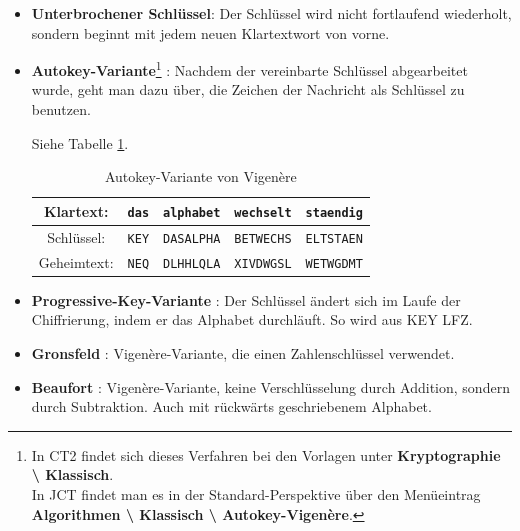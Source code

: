 \begin{refsegment}
\begin{itemize}
\begin{itemize}
   \item \textbf{Unterbrochener Schlüssel}:
     Der Schlüssel wird nicht fortlaufend wiederholt, sondern beginnt mit
     jedem neuen Klartextwort von vorne.



   \item \textbf{Autokey-Variante}\footnote{%
   In CT2 findet sich dieses Verfahren bei den Vorlagen
   unter \textbf{Kryptographie \textbackslash{} Klassisch}.\\
   In JCT findet man es in der Standard-Perspektive
   über den Menüeintrag \textbf{Algorithmen \textbackslash{} Klassisch
   \textbackslash{} Autokey-Vigen\`ere}.
   } \cite{Savard1999}:
      Nachdem der vereinbarte Schlüssel abgearbeitet wurde, geht man dazu
      über, die Zeichen der Nachricht als Schlüssel zu benutzen.

      Siehe Tabelle \ref{Autokey-table-reference}.

   \begin{table}[ht]
   \begin{center}
   \begin{tabular}{|c|c|c|c|c|}
   \hline
   Klartext:   & {\tt das} & {\tt alphabet} & {\tt wechselt} & {\tt staendig}\\
   \hline
   Schlüssel: & {\tt KEY} & {\tt DASALPHA} & {\tt BETWECHS} & {\tt ELTSTAEN}\\
   \hline
   Geheimtext: & {\tt NEQ} & {\tt DLHHLQLA} & {\tt XIVDWGSL} & {\tt WETWGDMT}\\
   \hline
   \end{tabular}
   \caption{Autokey-Variante von Vigen\`ere}
   \label{Autokey-table-reference}	
   \end{center}
   \end{table}  %


   \item \textbf{Progressive-Key-Variante} \cite{Savard1999}:
      Der Schlüssel ändert sich im Laufe der Chiffrierung, indem er das
      Alphabet durchläuft. So wird aus KEY LFZ.

   \item \textbf{Gronsfeld} \cite{Savard1999}:
      Vigen\`ere-Variante, die einen Zahlenschlüssel verwendet.

   \item \textbf{Beaufort} \cite{Savard1999}:
      Vigen\`ere-Variante, keine Verschlüsselung durch Addition, sondern durch
      Subtraktion. Auch mit rückwärts geschriebenem Alphabet.


\end{itemize}
\end{itemize}
\end{refsegment}

